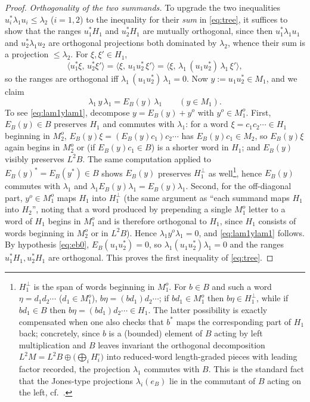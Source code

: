 \documentclass[a4paper, 11pt, reqno]{amsart}
\numberwithin{equation}{section}
\theoremstyle{plain}
\theoremstyle{remark}
\theoremstyle{definition}
\newcommand{\S}{\mathbb{S}}
\begin{document}
\begin{proof}
\emph{Orthogonality of the two summands.} To upgrade the two inequalities $u_i^*\lambda_1 u_i\le\lambda_2$ ($i=1,2$) to the inequality for their \emph{sum} in \eqref{eq:tree}, it suffices to show that the ranges $u_1^*H_1$ and $u_2^*H_1$ are mutually orthogonal, since then $u_1^*\lambda_1 u_1$ and $u_2^*\lambda_1 u_2$ are orthogonal projections both dominated by $\lambda_2$, whence their sum is a projection $\le\lambda_2$. For $\xi,\xi'\in H_1$,
\[
\langle u_1^*\xi,\,u_2^*\xi'\rangle=\langle\xi,\,u_1u_2^*\,\xi'\rangle=\langle\xi,\,\lambda_1\,(u_1u_2^*)\,\lambda_1\,\xi'\rangle,
\]
so the ranges are orthogonal iff $\lambda_1\,(u_1u_2^*)\,\lambda_1=0$. Now $y:=u_1u_2^*\in M_1$, and we claim
\begin{equation}\label{eq:lam1ylam1}
\lambda_1\,y\,\lambda_1=E_B(y)\,\lambda_1\qquad(y\in M_1).
\end{equation}
To see \eqref{eq:lam1ylam1}, decompose $y=E_B(y)+y^o$ with $y^o\in M_1^o$. First, $E_B(y)\in B$ preserves $H_1$ and commutes with $\lambda_1$: for a word $\xi=c_1c_2\cdots\in H_1$ beginning in $M_2^o$, $E_B(y)\xi=(E_B(y)c_1)c_2\cdots$ has $E_B(y)c_1\in M_2$, so $E_B(y)\xi$ again begins in $M_2^o$ or (if $E_B(y)c_1\in B$) is a shorter word in $H_1$; and $E_B(y)$ visibly preserves $L^2B$. The same computation applied to $E_B(y)^*=E_B(y^*)\in B$ shows $E_B(y)$ preserves $H_1^\perp$ as well\footnote{$H_1^\perp$ is the span of words beginning in $M_1^o$. For $b\in B$ and such a word $\eta=d_1d_2\cdots$ ($d_1\in M_1^o$), $b\eta=(bd_1)d_2\cdots$; if $bd_1\in M_1^o$ then $b\eta\in H_1^\perp$, while if $bd_1\in B$ then $b\eta=(bd_1)d_2\cdots\in H_1$. The latter possibility is exactly compensated when one also checks that $b^*$ maps the corresponding part of $H_1$ back; concretely, since $b$ is a (bounded) element of $B$ acting by left multiplication and $B$ leaves invariant the orthogonal decomposition $L^2M=L^2B\oplus\big(\bigoplus_{i}H_i^{\circ}\big)$ into reduced-word length-graded pieces with leading factor recorded, the projection $\lambda_1$ commutes with $B$. This is the standard fact that the Jones-type projections $\lambda_i(e_B)$ lie in the commutant of $B$ acting on the left, cf.\ \cite[\S4]{toyosawa2025relative}.}, hence $E_B(y)$ commutes with $\lambda_1$ and $\lambda_1 E_B(y)\lambda_1=E_B(y)\lambda_1$. Second, for the off-diagonal part, $y^o\in M_1^o$ maps $H_1$ into $H_1^\perp$ (the same argument as ``each summand maps $H_1$ into $H_2$'', noting that a word produced by prepending a single $M_1^o$ letter to a word of $H_1$ begins in $M_1^o$ and is therefore orthogonal to $H_1$, since $H_1$ consists of words beginning in $M_2^o$ or in $L^2B$). Hence $\lambda_1 y^o\lambda_1=0$, and \eqref{eq:lam1ylam1} follows. By hypothesis \eqref{eq:eb0}, $E_B(u_1u_2^*)=0$, so $\lambda_1(u_1u_2^*)\lambda_1=0$ and the ranges $u_1^*H_1,u_2^*H_1$ are orthogonal. This proves the first inequality of \eqref{eq:tree}.


\end{proof}
\end{document}
